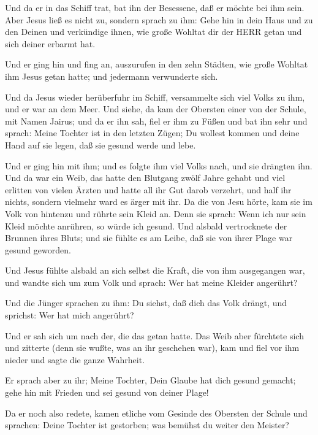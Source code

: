  Und da er in das Schiff trat, bat ihn der Besessene, daß
er möchte bei ihm sein.  Aber Jesus ließ es nicht zu,
sondern sprach zu ihm: Gehe hin in dein Haus und zu den Deinen und
verkündige ihnen, wie große Wohltat dir der HERR getan und sich deiner
erbarmt hat.

 Und er ging hin und fing an, auszurufen in den zehn
Städten, wie große Wohltat ihm Jesus getan hatte; und jedermann
verwunderte sich.

 Und da Jesus wieder herüberfuhr im Schiff, versammelte
sich viel Volks zu ihm, und er war an dem Meer.  Und siehe,
da kam der Obersten einer von der Schule, mit Namen Jairus; und da er
ihn sah, fiel er ihm zu Füßen  und bat ihn sehr und sprach:
Meine Tochter ist in den letzten Zügen; Du wollest kommen und deine Hand
auf sie legen, daß sie gesund werde und lebe.

 Und er ging hin mit ihm; und es folgte ihm viel Volks
nach, und sie drängten ihn.  Und da war ein Weib, das hatte
den Blutgang zwölf Jahre gehabt  und viel erlitten von
vielen Ärzten und hatte all ihr Gut darob verzehrt, und half ihr nichts,
sondern vielmehr ward es ärger mit ihr.  Da die von Jesu
hörte, kam sie im Volk von hintenzu und rührte sein Kleid an.
 Denn sie sprach: Wenn ich nur sein Kleid möchte anrühren,
so würde ich gesund.  Und alsbald vertrocknete der Brunnen
ihres Bluts; und sie fühlte es am Leibe, daß sie von ihrer Plage war
gesund geworden.

 Und Jesus fühlte alsbald an sich selbst die Kraft, die von
ihm ausgegangen war, und wandte sich um zum Volk und sprach: Wer hat
meine Kleider angerührt?

 Und die Jünger sprachen zu ihm: Du siehst, daß dich das
Volk drängt, und sprichst: Wer hat mich angerührt?

 Und er sah sich um nach der, die das getan hatte.
 Das Weib aber fürchtete sich und zitterte (denn sie wußte,
was an ihr geschehen war), kam und fiel vor ihm nieder und sagte die
ganze Wahrheit.

 Er sprach aber zu ihr; Meine Tochter, Dein Glaube hat dich
gesund gemacht; gehe hin mit Frieden und sei gesund von deiner Plage!

 Da er noch also redete, kamen etliche vom Gesinde des
Obersten der Schule und sprachen: Deine Tochter ist gestorben; was
bemühst du weiter den Meister?

